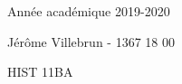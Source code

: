 \documentclass[12pt]{article}
\begin{document}
\begin{titlepage}
\begin{flushright}
		\fontsize{12}{12}\selectfont \assib  \hspace*{\dimexpr\lplusgrand - \dimexpr\lassib}
	\end{flushright}
	
	\vspace{3.5cm}
	\begin{center}
		\fontsize{12}{12}\selectfont Année académique 2019-2020                       %
		
		\fontsize{12}{12}\selectfont Jérôme Villebrun - 1367 18 00                     %
		
		\fontsize{12}{12}\selectfont HIST 11BA                                     %
	\end{center}
	
	
\end{titlepage}
\setlength{\parskip}{2mm}
\end{document}
